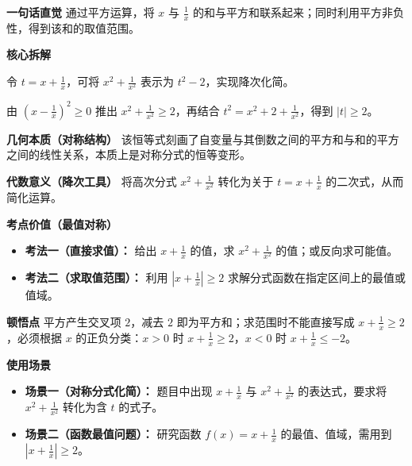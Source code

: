 \begin{explanationbox}
	\textbf{\textcolor{CExplanation}{一句话直觉}}
	通过平方运算，将 $x$ 与 $\frac{1}{x}$ 的和与平方和联系起来；同时利用平方非负性，得到该和的取值范围。

	\medskip
	\textbf{\textcolor{CExplanation}{核心拆解}}
	\begin{description}[style=nextline, leftmargin=2.8em, labelsep=0.5em, itemsep=0.45em]
		\item[\textbf{要点一（倒数换元）：}]
		      令 $t = x + \frac{1}{x}$，可将 $x^2 + \frac{1}{x^2}$ 表示为 $t^2 - 2$，实现降次化简。
		\item[\textbf{要点二（绝对值下界）：}]
		      由 $\left(x-\frac{1}{x}\right)^2 \ge 0$ 推出 $x^2+\frac{1}{x^2}\ge 2$，再结合 $t^2=x^2+2+\frac{1}{x^2}$，得到 $|t|\ge 2$。
	\end{description}

	\medskip
	\textbf{\textcolor{CExplanation}{几何本质（对称结构）}}
	该恒等式刻画了自变量与其倒数之间的平方和与和的平方之间的线性关系，本质上是对称分式的恒等变形。

	\medskip
	\textbf{\textcolor{CExplanation}{代数意义（降次工具）}}
	将高次分式 $x^2+\frac{1}{x^2}$ 转化为关于 $t=x+\frac{1}{x}$ 的二次式，从而简化运算。

	\medskip
	\textbf{\textcolor{CExplanation}{考点价值（最值对称）}}
	\begin{itemize}[leftmargin=*, itemsep=0.5em, topsep=0.4em]
		\item \textbf{考法一（直接求值）：} 给出 $x+\frac{1}{x}$ 的值，求 $x^2+\frac{1}{x^2}$ 的值；或反向求可能值。
		\item \textbf{考法二（求取值范围）：} 利用 $\left|x+\frac{1}{x}\right|\ge 2$ 求解分式函数在指定区间上的最值或值域。
	\end{itemize}

	\medskip
	\textbf{\textcolor{CExplanation}{顿悟点}}
	平方产生交叉项 $2$，减去 $2$ 即为平方和；求范围时不能直接写成 $x+\frac{1}{x}\ge 2$，必须根据 $x$ 的正负分类：$x>0$ 时 $x+\frac{1}{x}\ge 2$，$x<0$ 时 $x+\frac{1}{x}\le -2$。

	\medskip
	\textbf{\textcolor{CExplanation}{使用场景}}
	\begin{itemize}[leftmargin=*, itemsep=0.5em, topsep=0.4em]
		\item \textbf{场景一（对称分式化简）：} 题目中出现 $x+\frac{1}{x}$ 与 $x^2+\frac{1}{x^2}$ 的表达式，要求将 $x^2+\frac{1}{x^2}$ 转化为含 $t$ 的式子。
		\item \textbf{场景二（函数最值问题）：} 研究函数 $f(x)=x+\frac{1}{x}$ 的最值、值域，需用到 $\left|x+\frac{1}{x}\right|\ge 2$。
	\end{itemize}

\end{explanationbox}